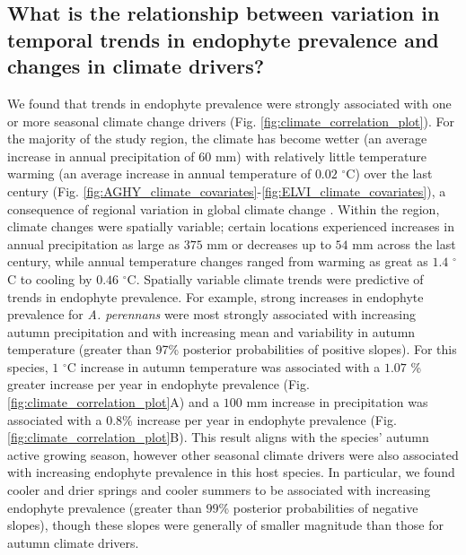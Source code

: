 \documentclass[11pt]{article}
\let\cite\citep
\newcommand{\firstrevise}[1]{{\color{black}{#1}}}
\begin{document}
\subsection*{What is the relationship between variation in temporal trends in endophyte prevalence and changes in climate drivers?}
We found that trends in endophyte prevalence were strongly associated with one or more seasonal climate change drivers (Fig. \ref{fig:climate_correlation_plot}).
For the majority of the study region, the climate has become wetter (an average increase in annual precipitation of $60$ mm) with relatively little temperature warming (an average increase in annual temperature of $0.02$ $^{\circ}$C) over the last century (Fig. \ref{fig:AGHY_climate_covariates}-\ref{fig:ELVI_climate_covariates}), a consequence of regional variation in global climate change \cite{ipcc_2021}. 
Within the region, climate changes were spatially variable; certain locations experienced increases in annual precipitation as large as $375$ mm or decreases up to $54$ mm across the last century, while annual temperature changes ranged from warming as great as $1.4$ $^{\circ}$C to cooling by $0.46$ $^{\circ}$C.
Spatially variable climate trends were predictive of trends in endophyte prevalence.
For example, strong increases in endophyte prevalence for \emph{A. perennans} were most strongly associated with increasing autumn precipitation and with increasing mean and variability in autumn temperature (greater than 97\% posterior probabilities of positive slopes).
For this species, \firstrevise{each} $1$ $^{\circ}$C increase in autumn temperature was associated with a $1.07$ \% greater increase per year in endophyte prevalence (Fig. \ref{fig:climate_correlation_plot}A) and a $100$ mm increase in precipitation was associated with a $0.8$\% \firstrevise{greater} increase per year in endophyte prevalence (Fig. \ref{fig:climate_correlation_plot}B).
This result aligns with the species' autumn active growing season, however other seasonal climate drivers were also associated with increasing endophyte prevalence in this host species. 
In particular, we found cooler and drier springs and cooler summers to be associated with increasing endophyte prevalence (greater than $99$\% posterior probabilities of negative slopes), though these slopes were generally of smaller magnitude than those for autumn climate drivers.
\end{document}
